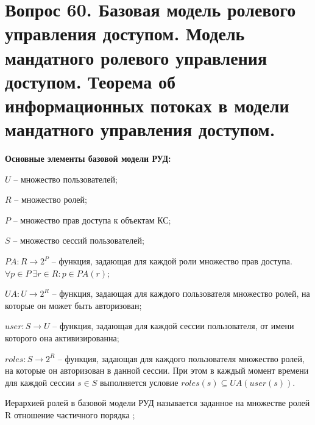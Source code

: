 \section{Вопрос 60. Базовая модель ролевого управления доступом. Модель мандатного ролевого управления доступом.
Теорема об информационных потоках в модели мандатного управления доступом.}

\textbf{Основные элементы базовой модели РУД:}
\begin{enumerate*}
	\item $U$ -- множество пользователей;
	\item $R$ -- множество ролей;
	\item $P$ -- множество прав доступа к объектам КС;
	\item $S$ -- множество сессий пользователей;
	\item $PA: R \to 2^P$ -- функция, задающая для каждой роли множество прав доступа. $\forall p \in P \ \exists r \in R : p \in PA(r)$;
	\item $UA: U \to 2^R$ -- функция, задающая для каждого пользователя множество ролей, на которые он может быть авторизован;
	\item $user: S \to U$ -- функция, задающая для каждой сессии пользователя, от имени которого она активизированна;
	\item $roles: S \to 2^R$ -- функция, задающая для каждого пользователя множество ролей, на которые он авторизован в данной сессии. При этом
	в каждый момент времени для каждой сессии $s \in S$ выполняется условие $roles(s) \subseteq UA(user(s))$.
\end{enumerate*}

\begin{defs}[Иерархия]
	Иерархией ролей в базовой модели РУД называется заданное на множестве ролей R отношение частичного порядка \kav{$\leqslant$};
\end{defs}

